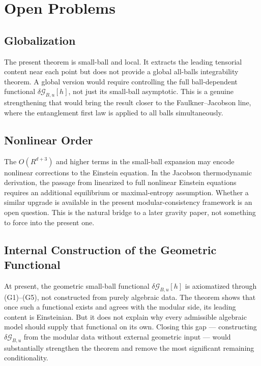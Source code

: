 \documentclass[12pt]{article}
\theoremstyle{definition}
\theoremstyle{remark}
\begin{document}
\section{Open Problems}\label{sec:8}

\subsection{Globalization}\label{subsec:8.1}

The present theorem is small-ball and local. It extracts the leading tensorial content near each point but does not provide a global all-balls integrability theorem. A global version would require controlling the full ball-dependent functional \(\delta\mathcal{G}_{B,u}[h]\), not just its small-ball asymptotic. This is a genuine strengthening that would bring the result closer to the Faulkner\cite{Faulkner2014}--Jacobson\cite{Jacobson2016} line, where the entanglement first law is applied to all balls simultaneously.

\subsection{Nonlinear Order}\label{subsec:8.2}

The \(O(R^{d+3})\) and higher terms in the small-ball expansion may encode nonlinear corrections to the Einstein equation. In the Jacobson\cite{Jacobson2016} thermodynamic derivation, the passage from linearized to full nonlinear Einstein equations requires an additional equilibrium or maximal-entropy assumption. Whether a similar upgrade is available in the present modular-consistency framework is an open question. This is the natural bridge to a later gravity paper, not something to force into the present one.

\subsection{Internal Construction of the Geometric Functional}\label{subsec:8.3}

At present, the geometric small-ball functional \(\delta\mathcal{G}_{B,u}[h]\) is axiomatized through (G1)--(G5), not constructed from purely algebraic data. The theorem shows that once such a functional exists and agrees with the modular side, its leading content is Einsteinian. But it does not explain why every admissible algebraic model should supply that functional on its own. Closing this gap --- constructing \(\delta\mathcal{G}_{B,u}\) from the modular data without external geometric input --- would substantially strengthen the theorem and remove the most significant remaining conditionality.
\end{document}
